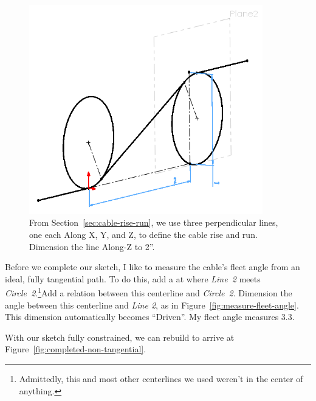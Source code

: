 \begin{figure}[H]
\begin{center}
  \includegraphics[width=4in]{images/figures/departure-dims.png}
\end{center}
\caption{From Section~\ref{sec:cable-rise-run}, we use three perpendicular lines, one each Along X, Y, and Z, to define the cable
rise and run. Dimension the line Along-Z to 2''. \label{fig:departure-dims}}

\end{figure}

Before we complete our sketch, I like to measure the cable's fleet angle from an ideal,
fully tangential path. To do this, add a 
 at where \emph{Line~2} meets \emph{Circle~2}.\footnote{Admittedly, this and most other
 centerlines we used weren't in the center of anything.}Add a
  relation between this centerline and \emph{Circle~2}.
Dimension the angle between this centerline and \emph{Line 2}, as in
Figure~\ref{fig:measure-fleet-angle}. This dimension automatically becomes
``Driven''. My fleet angle measures 3.3\textdegree.

With our sketch fully constrained, we can rebuild  to arrive
at Figure~\ref{fig:completed-non-tangential}.

